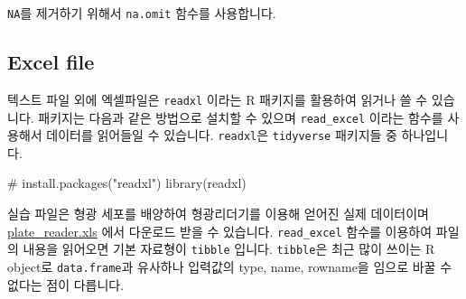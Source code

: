 \documentclass[
  a4paper,
]{book}
\newenvironment{Shaded}{\begin{snugshade}}{\end{snugshade}}
\newcommand{\AttributeTok}[1]{\textcolor[rgb]{0.40,0.45,0.13}{#1}}
\newcommand{\CommentTok}[1]{\textcolor[rgb]{0.37,0.37,0.37}{#1}}
\newcommand{\DecValTok}[1]{\textcolor[rgb]{0.68,0.00,0.00}{#1}}
\newcommand{\FunctionTok}[1]{\textcolor[rgb]{0.28,0.35,0.67}{#1}}
\newcommand{\NormalTok}[1]{\textcolor[rgb]{0.00,0.23,0.31}{#1}}
\newcommand{\OtherTok}[1]{\textcolor[rgb]{0.00,0.23,0.31}{#1}}
\newcommand{\SpecialCharTok}[1]{\textcolor[rgb]{0.37,0.37,0.37}{#1}}
\begin{document}
\texttt{NA}를 제거하기 위해서 \texttt{na.omit} 함수를 사용합니다.

\begin{Shaded}
\end{Shaded}

\hypertarget{excel-file}{%
\subsection{Excel file}\label{excel-file}}

텍스트 파일 외에 엑셀파일은 \texttt{readxl} 이라는 R 패키지를 활용하여
읽거나 쓸 수 있습니다. 패키지는 다음과 같은 방법으로 설치할 수 있으며
\texttt{read\_excel} 이라는 함수를 사용해서 데이터를 읽어들일 수
있습니다. \texttt{readxl}은 \texttt{tidyverse} 패키지들 중 하나입니다.

\begin{Shaded}
\begin{Highlighting}[]
\CommentTok{\# install.packages("readxl")}
\FunctionTok{library}\NormalTok{(readxl)}
\end{Highlighting}
\end{Shaded}

실습 파일은 형광 세포를 배양하여 형광리더기를 이용해 얻어진 실제
데이터이며 \url{plate_reader.xls} 에서 다운로드 받을 수 있습니다.
\texttt{read\_excel} 함수를 이용하여 파일의 내용을 읽어오면 기본
자료형이 \texttt{tibble} 입니다. \texttt{tibble}은 최근 많이 쓰이는 R
object로 \texttt{data.frame}과 유사하나 입력값의 type, name, rowname을
임으로 바꿀 수 없다는 점이 다릅니다.
\end{document}
